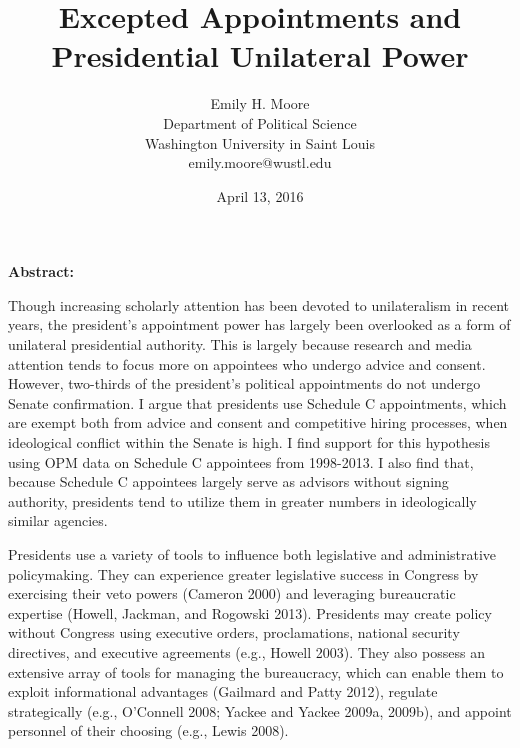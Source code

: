 \documentclass[12pt]{article}
\title{\vspace{2.8in}Excepted Appointments and Presidential Unilateral Power}
\author{Emily H. Moore\\Department of Political Science\\Washington University in Saint Louis\\emily.moore@wustl.edu}
\date{April 13, 2016}
\begin{document}

\maketitle
\parindent=0.5in
\parskip=0.01in
\doublespacing

\newpage
\noindent \textbf{Abstract:}

Though increasing scholarly attention has been devoted to unilateralism in recent years, the president's appointment power has largely been overlooked as a form of unilateral presidential authority. This is largely because research and media attention tends to focus more on appointees who undergo advice and consent. However, two-thirds of the president's political appointments do not undergo Senate confirmation. I argue that presidents use Schedule C appointments, which are exempt both from advice and consent and competitive hiring processes, when ideological conflict within the Senate is high. I find support for this hypothesis using OPM data on Schedule C appointees from 1998-2013. I also find that, because Schedule C appointees largely serve as advisors without signing authority, presidents tend to utilize them in greater numbers in ideologically similar agencies. 

\newpage
{}

Presidents use a variety of tools to influence both legislative and administrative policymaking. They can experience greater legislative success in Congress by exercising their veto powers (Cameron 2000) and leveraging bureaucratic expertise (Howell, Jackman, and Rogowski 2013). Presidents may create policy without Congress using executive orders, proclamations, national security directives, and executive agreements (e.g., Howell 2003). They  also possess an extensive array of tools for managing the bureaucracy, which can enable them to exploit informational advantages (Gailmard and Patty 2012), regulate strategically (e.g., O'Connell 2008; Yackee and Yackee 2009a, 2009b), and appoint personnel of their choosing (e.g., Lewis 2008). 
\end{document}
